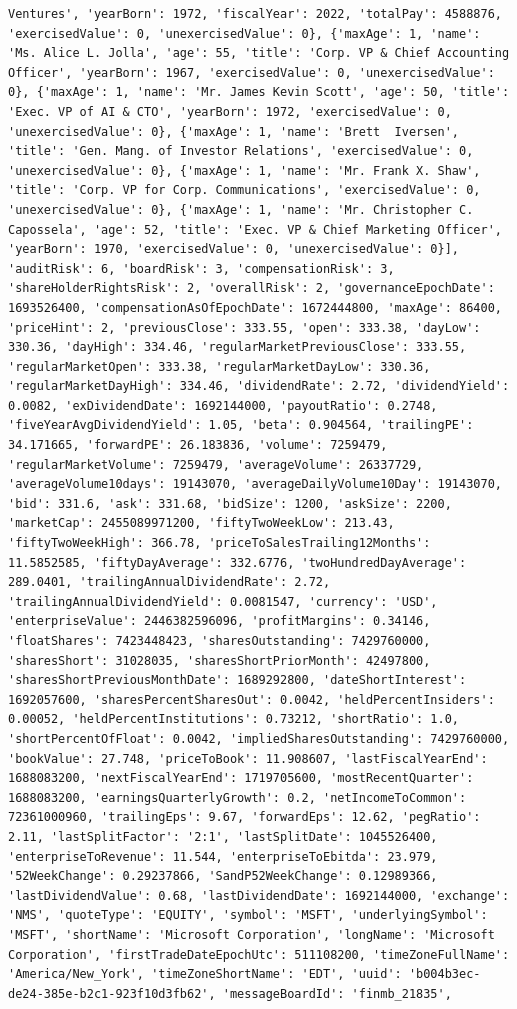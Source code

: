 \documentclass[
  letterpaper,
]{report}
\begin{document}
\begin{verbatim}
Ventures', 'yearBorn': 1972, 'fiscalYear': 2022, 'totalPay': 4588876, 'exercisedValue': 0, 'unexercisedValue': 0}, {'maxAge': 1, 'name': 'Ms. Alice L. Jolla', 'age': 55, 'title': 'Corp. VP & Chief Accounting Officer', 'yearBorn': 1967, 'exercisedValue': 0, 'unexercisedValue': 0}, {'maxAge': 1, 'name': 'Mr. James Kevin Scott', 'age': 50, 'title': 'Exec. VP of AI & CTO', 'yearBorn': 1972, 'exercisedValue': 0, 'unexercisedValue': 0}, {'maxAge': 1, 'name': 'Brett  Iversen', 'title': 'Gen. Mang. of Investor Relations', 'exercisedValue': 0, 'unexercisedValue': 0}, {'maxAge': 1, 'name': 'Mr. Frank X. Shaw', 'title': 'Corp. VP for Corp. Communications', 'exercisedValue': 0, 'unexercisedValue': 0}, {'maxAge': 1, 'name': 'Mr. Christopher C. Capossela', 'age': 52, 'title': 'Exec. VP & Chief Marketing Officer', 'yearBorn': 1970, 'exercisedValue': 0, 'unexercisedValue': 0}], 'auditRisk': 6, 'boardRisk': 3, 'compensationRisk': 3, 'shareHolderRightsRisk': 2, 'overallRisk': 2, 'governanceEpochDate': 1693526400, 'compensationAsOfEpochDate': 1672444800, 'maxAge': 86400, 'priceHint': 2, 'previousClose': 333.55, 'open': 333.38, 'dayLow': 330.36, 'dayHigh': 334.46, 'regularMarketPreviousClose': 333.55, 'regularMarketOpen': 333.38, 'regularMarketDayLow': 330.36, 'regularMarketDayHigh': 334.46, 'dividendRate': 2.72, 'dividendYield': 0.0082, 'exDividendDate': 1692144000, 'payoutRatio': 0.2748, 'fiveYearAvgDividendYield': 1.05, 'beta': 0.904564, 'trailingPE': 34.171665, 'forwardPE': 26.183836, 'volume': 7259479, 'regularMarketVolume': 7259479, 'averageVolume': 26337729, 'averageVolume10days': 19143070, 'averageDailyVolume10Day': 19143070, 'bid': 331.6, 'ask': 331.68, 'bidSize': 1200, 'askSize': 2200, 'marketCap': 2455089971200, 'fiftyTwoWeekLow': 213.43, 'fiftyTwoWeekHigh': 366.78, 'priceToSalesTrailing12Months': 11.5852585, 'fiftyDayAverage': 332.6776, 'twoHundredDayAverage': 289.0401, 'trailingAnnualDividendRate': 2.72, 'trailingAnnualDividendYield': 0.0081547, 'currency': 'USD', 'enterpriseValue': 2446382596096, 'profitMargins': 0.34146, 'floatShares': 7423448423, 'sharesOutstanding': 7429760000, 'sharesShort': 31028035, 'sharesShortPriorMonth': 42497800, 'sharesShortPreviousMonthDate': 1689292800, 'dateShortInterest': 1692057600, 'sharesPercentSharesOut': 0.0042, 'heldPercentInsiders': 0.00052, 'heldPercentInstitutions': 0.73212, 'shortRatio': 1.0, 'shortPercentOfFloat': 0.0042, 'impliedSharesOutstanding': 7429760000, 'bookValue': 27.748, 'priceToBook': 11.908607, 'lastFiscalYearEnd': 1688083200, 'nextFiscalYearEnd': 1719705600, 'mostRecentQuarter': 1688083200, 'earningsQuarterlyGrowth': 0.2, 'netIncomeToCommon': 72361000960, 'trailingEps': 9.67, 'forwardEps': 12.62, 'pegRatio': 2.11, 'lastSplitFactor': '2:1', 'lastSplitDate': 1045526400, 'enterpriseToRevenue': 11.544, 'enterpriseToEbitda': 23.979, '52WeekChange': 0.29237866, 'SandP52WeekChange': 0.12989366, 'lastDividendValue': 0.68, 'lastDividendDate': 1692144000, 'exchange': 'NMS', 'quoteType': 'EQUITY', 'symbol': 'MSFT', 'underlyingSymbol': 'MSFT', 'shortName': 'Microsoft Corporation', 'longName': 'Microsoft Corporation', 'firstTradeDateEpochUtc': 511108200, 'timeZoneFullName': 'America/New_York', 'timeZoneShortName': 'EDT', 'uuid': 'b004b3ec-de24-385e-b2c1-923f10d3fb62', 'messageBoardId': 'finmb_21835', 
\end{verbatim}
\end{document}
